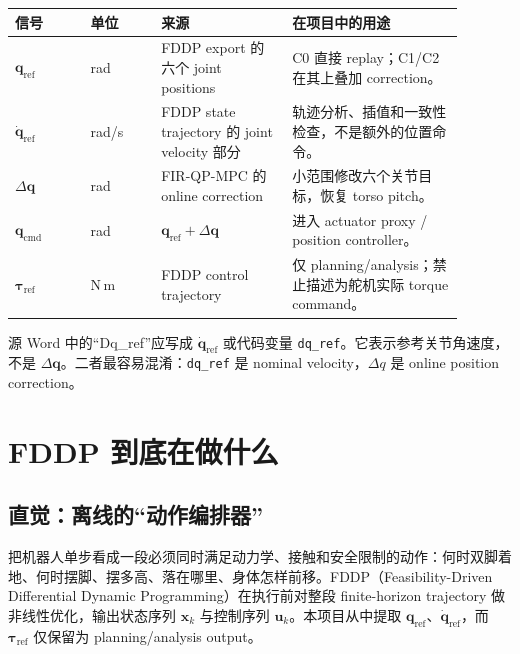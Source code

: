 \documentclass[UTF8,11pt,a4paper]{ctexart}
\newcommand{\code}[1]{\texttt{#1}}
\begin{document}
\begin{longtable}{@{}p{0.15\linewidth}p{0.14\linewidth}p{0.26\linewidth}p{0.34\linewidth}@{}}
\toprule
信号 & 单位 & 来源 & 在项目中的用途 \\
\midrule
\endhead
$\bm q_{\mathrm{ref}}$ & rad & FDDP export 的六个 joint positions & C0 直接 replay；C1/C2 在其上叠加 correction。\\
$\dot{\bm q}_{\mathrm{ref}}$ & rad/s & FDDP state trajectory 的 joint velocity 部分 & 轨迹分析、插值和一致性检查，不是额外的位置命令。\\
$\Delta\bm q$ & rad & FIR-QP-MPC 的 online correction & 小范围修改六个关节目标，恢复 torso pitch。\\
$\bm q_{\mathrm{cmd}}$ & rad & $\bm q_{\mathrm{ref}}+\Delta\bm q$ & 进入 actuator proxy / position controller。\\
$\bm\tau_{\mathrm{ref}}$ & N\,m & FDDP control trajectory & 仅 planning/analysis；禁止描述为舵机实际 torque command。\\
\bottomrule
\end{longtable}

源 Word 中的“Dq\_ref”应写成 $\dot{\bm q}_{\mathrm{ref}}$ 或代码变量 \code{dq\_ref}。它表示参考关节角速度，不是 $\Delta\bm q$。二者最容易混淆：\code{dq\_ref} 是 nominal velocity，$\Delta q$ 是 online position correction。

\section{FDDP 到底在做什么}\label{sec:fddp}

\subsection{直觉：离线的“动作编排器”}

把机器人单步看成一段必须同时满足动力学、接触和安全限制的动作：何时双脚着地、何时摆脚、摆多高、落在哪里、身体怎样前移。FDDP（Feasibility-Driven Differential Dynamic Programming）在执行前对整段 finite-horizon trajectory 做非线性优化，输出状态序列 $\bm x_k$ 与控制序列 $\bm u_k$。本项目从中提取 $\bm q_{\mathrm{ref}}$、$\dot{\bm q}_{\mathrm{ref}}$，而 $\bm\tau_{\mathrm{ref}}$ 仅保留为 planning/analysis output。
\end{document}
